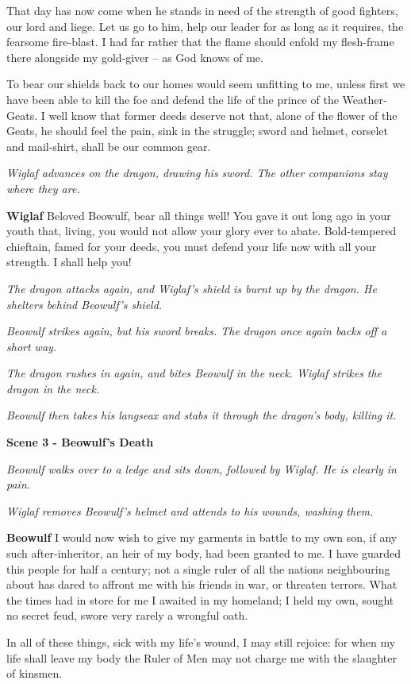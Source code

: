 \documentclass[a4paper]{article}
\begin{document}
{That day has now come
when he stands in need of the strength of good fighters,
our lord and liege. Let us go to him,
help our leader for as long as it requires,
the fearsome fire-blast. I had far rather
that the flame should enfold my flesh-frame there
alongside my gold-giver – as God knows of me.

To bear our shields back to our homes
would seem unfitting to me, unless first we have been able
to kill the foe and defend the life
of the prince of the Weather-Geats. I well know
that former deeds deserve not that, alone
of the flower of the Geats, he should feel the pain,
sink in the struggle; sword and helmet,
corselet and mail-shirt, shall be our common gear.

\centerline{\textit{Wiglaf advances on the dragon, drawing his sword. The other companions stay where they are.}}

\textbf{Wiglaf} Beloved Beowulf, bear all things well!
You gave it out long ago in your youth
that, living, you would not allow your glory
ever to abate. Bold-tempered chieftain,
famed for your deeds, you must defend your life now
with all your strength. I shall help you!

\centerline{\textit{The dragon attacks again, and Wiglaf's shield is burnt up by the dragon. He shelters behind Beowulf's shield.}}
\centerline{\textit{Beowulf strikes again, but his sword breaks. The dragon once again backs off a short way.}}

\centerline{\textit{The dragon rushes in again, and bites Beowulf in the neck. Wiglaf strikes the dragon in the neck.}}
\centerline{\textit{Beowulf then takes his langseax and stabs it through the dragon's body, killing it.}}

\centerline{\textbf{Scene 3 - Beowulf's Death}}
\centerline{\textit{Beowulf walks over to a ledge and sits down, followed by Wiglaf. He is clearly in pain.}}
\centerline{\textit{Wiglaf removes Beowulf's helmet and attends to his wounds, washing them.}}

\textbf{Beowulf} I would now wish to give my garments in battle
to my own son, if any such
after-inheritor, an heir of my body,
had been granted to me. I have guarded this people
for half a century; not a single ruler
of all the nations neighbouring about
has dared to affront me with his friends in war,
or threaten terrors. What the times had in store for me
I awaited in my homeland; I held my own,
sought no secret feud, swore very rarely
a wrongful oath.

In all of these things,
sick with my life’s wound, I may still rejoice:
for when my life shall leave my body
the Ruler of Men may not charge me
with the slaughter of kinsmen.

}
\end{document}
